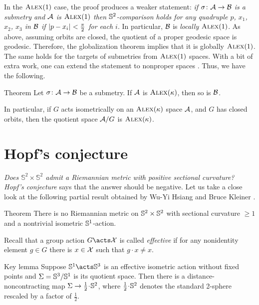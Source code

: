 In the $\textup{\textsc{Alex}}(1)$ case, the proof produces a weaker statement: \textit{if $\sigma\colon\mathcal{A}\to\mathcal{B}$ is a submetry and $\mathcal{A}$ is $\textup{\textsc{Alex}}(1)$ then $\mathbb{S}^2$-comparison holds for any quadruple $p$, $x_1$, $x_2$, $x_3$ in $\mathcal{B}$ if $\dist{p}{x_i}{}<\tfrac\pi 2$ for each $i$}.
In particular, $\mathcal{B}$ is \textit{locally} $\textup{\textsc{Alex}}(1)$.
As above, assuming orbits are closed, the quotient of a proper geodesic space is geodesic.
Therefore, the globalization theorem implies that it is globally $\textup{\textsc{Alex}}(1)$.
The same holds for the targets of submetries from $\textup{\textsc{Alex}}(1)$ spaces.
With a bit of extra work, one can extend the statement to nonproper spaces \cite[8.34]{alexander-kapovitch-petrunin2024}.
Thus, we have the following.

\begin{thm}{Theorem}\label{thm:submetry-CBB-1}
Let $\sigma\colon\mathcal{A}\to\mathcal{B}$ be a submetry.
If $\mathcal{A}$ is $\textup{\textsc{Alex}}(\kappa)$, then so is $\mathcal{B}$.

In particular, if $G$ acts isometrically on an $\textup{\textsc{Alex}}(\kappa)$ space $\mathcal{A}$, and $G$ has closed orbits, then the quotient space $\mathcal{A}/G$ is $\textup{\textsc{Alex}}(\kappa)$.

\end{thm}

\section{Hopf's conjecture}

\textit{Does $\mathbb{S}^2\times\mathbb{S}^2$ admit a Riemannian metric with positive sectional curvature?} \emph{Hopf's conjecture} says that the answer should be negative.
Let us take a close look at the following partial result obtained by Wu-Yi Hsiang and Bruce Kleiner \cite{hsiang-kleiner}.

\begin{thm}{Theorem}\label{thm:hsiang-kleiner}
There is no Riemannian metric on $\mathbb{S}^2\times\mathbb{S}^2$ with sectional curvature $\ge 1$ and a nontrivial isometric $\mathbb{S}^1$-action.
\end{thm}

Recall that a group action $G\acts\spc{X}$ is called \emph{effective} if for any nonidentity element $g\in G$ there is $x\in\mathcal{X}$ such that $g\cdot x\ne x$.

\begin{thm}{Key lemma}\label{lem:S^3/S^1}
Suppose $\SSS^1\acts\SSS^3$ is an effective isometric action without fixed points
and $\Sigma=\mathbb{S}^3/\mathbb{S}^1$ is its quotient space.
Then there is a distance-noncontracting map $\Sigma\to \tfrac12\cdot \SSS^2$, where $\tfrac12\cdot \SSS^2$ denotes the standard 2-sphere rescaled by a factor of $\tfrac12$.
\end{thm}

